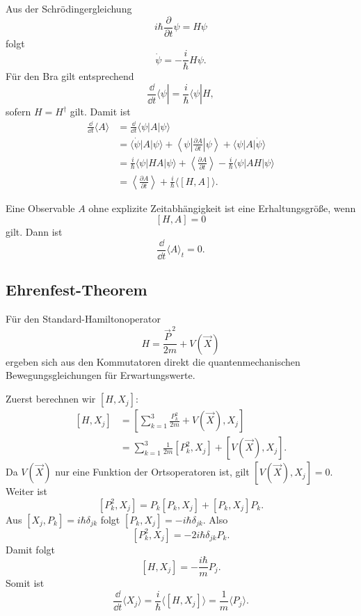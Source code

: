 \begin{derivationbox}
Aus der Schrödingergleichung
\[
    i\hbar\frac{\partial}{\partial t}\psi=H\psi
\]
folgt
\[
    \dot\psi=-\frac{i}{\hbar}H\psi.
\]
Für den Bra gilt entsprechend
\[
    \frac{\dd}{\dd t}\langle\psi|=\frac{i}{\hbar}\langle\psi|H,
\]
sofern $H=H^\dagger$ gilt. Damit ist
\[
\begin{aligned}
    \frac{\dd}{\dd t}\langle A\rangle
    &=\frac{\dd}{\dd t}\langle\psi|A|\psi\rangle \\
    &=\langle\dot\psi|A|\psi\rangle
      +\left\langle\psi\left|\frac{\partial A}{\partial t}\right|\psi\right\rangle
      +\langle\psi|A|\dot\psi\rangle \\
    &=\frac{i}{\hbar}\langle\psi|HA|\psi\rangle
      +\left\langle\frac{\partial A}{\partial t}\right\rangle
      -\frac{i}{\hbar}\langle\psi|AH|\psi\rangle \\
    &=\left\langle\frac{\partial A}{\partial t}\right\rangle
      +\frac{i}{\hbar}\langle[H,A]\rangle.
\end{aligned}
\]
\end{derivationbox}

\begin{formulabox}
Eine Observable $A$ ohne explizite Zeitabhängigkeit ist eine Erhaltungsgröße, wenn
\[
    [H,A]=0
\]
gilt. Dann ist
\[
    \frac{\dd}{\dd t}\langle A\rangle_t=0.
\]
\end{formulabox}

\subsection{Ehrenfest-Theorem}

Für den Standard-Hamiltonoperator
\[
    H=\frac{\vec P^{\,2}}{2m}+V(\vec X)
\]
ergeben sich aus den Kommutatoren direkt die quantenmechanischen Bewegungsgleichungen für Erwartungswerte.

\begin{derivationbox}
Zuerst berechnen wir $[H,X_j]$:
\[
\begin{aligned}
    [H,X_j]
    &=\left[\sum_{k=1}^3\frac{P_k^2}{2m}+V(\vec X),X_j\right] \\
    &=\sum_{k=1}^3\frac{1}{2m}[P_k^2,X_j]+[V(\vec X),X_j].
\end{aligned}
\]
Da $V(\vec X)$ nur eine Funktion der Ortsoperatoren ist, gilt $[V(\vec X),X_j]=0$. Weiter ist
\[
    [P_k^2,X_j]=P_k[P_k,X_j]+[P_k,X_j]P_k.
\]
Aus $[X_j,P_k]=i\hbar\delta_{jk}$ folgt $[P_k,X_j]=-i\hbar\delta_{jk}$. Also
\[
    [P_k^2,X_j]=-2i\hbar\delta_{jk}P_k.
\]
Damit folgt
\[
    [H,X_j]=-\frac{i\hbar}{m}P_j.
\]
Somit ist
\[
    \frac{\dd}{\dd t}\langle X_j\rangle
    =\frac{i}{\hbar}\langle[H,X_j]\rangle
    =\frac{1}{m}\langle P_j\rangle.
\]
\end{derivationbox}

